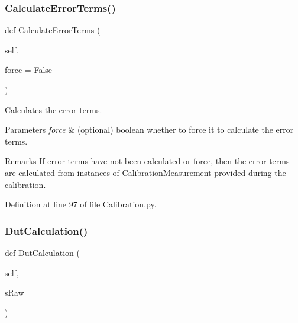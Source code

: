 \subsubsection{\texorpdfstring{Calculate\+Error\+Terms()}{CalculateErrorTerms()}}
{\footnotesize\ttfamily def Calculate\+Error\+Terms (\begin{DoxyParamCaption}\item[{}]{self,  }\item[{}]{force = {\ttfamily False} }\end{DoxyParamCaption})}



Calculates the error terms. 


\begin{DoxyParams}{Parameters}
{\em force} & (optional) boolean whether to force it to calculate the error terms. \\
\hline
\end{DoxyParams}
\begin{DoxyRemark}{Remarks}
If error terms have not been calculated or force, then the error terms are calculated from instances of Calibration\+Measurement provided during the calibration. 
\end{DoxyRemark}


Definition at line 97 of file Calibration.\+py.

\mbox{\label{classSignalIntegrity_1_1Measurement_1_1Calibration_1_1Calibration_1_1Calibration_ac257ff0d436f9c02507349f82ece9e56}} 
\subsubsection{\texorpdfstring{Dut\+Calculation()}{DutCalculation()}}
{\footnotesize\ttfamily def Dut\+Calculation (\begin{DoxyParamCaption}\item[{}]{self,  }\item[{}]{s\+Raw }\end{DoxyParamCaption})}



